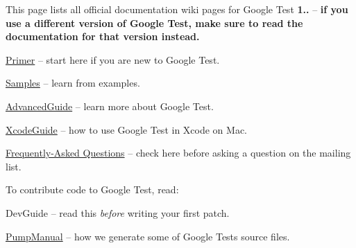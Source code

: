This page lists all official documentation wiki pages for Google Test {\bfseries 1..} -- {\bfseries if you use a different version of Google Test, make sure to read the documentation for that version instead.}


\begin{DoxyItemize}
\item \hyperlink{V1__5__Primer_8md}{Primer} -- start here if you are new to Google Test.
\item \hyperlink{Samples_8md}{Samples} -- learn from examples.
\item \hyperlink{V1__5__AdvancedGuide_8md}{Advanced\+Guide} -- learn more about Google Test.
\item \hyperlink{V1__5__XcodeGuide_8md}{Xcode\+Guide} -- how to use Google Test in Xcode on Mac.
\item \hyperlink{V1__5__FAQ_8md}{Frequently-\/\+Asked Questions} -- check here before asking a question on the mailing list.
\end{DoxyItemize}

To contribute code to Google Test, read\+:


\begin{DoxyItemize}
\item Dev\+Guide -- read this {\itshape before} writing your first patch.
\item \hyperlink{V1__5__PumpManual_8md}{Pump\+Manual} -- how we generate some of Google Test\textquotesingle{}s source files. 
\end{DoxyItemize}